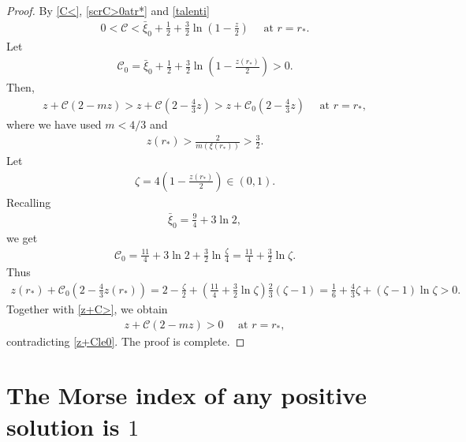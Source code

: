 \documentclass{article}
\theoremstyle{definition} \theoremstyle{remark}
\numberwithin{equation}{section}
\begin{document}
\begin{proof}
		By \eqref{C<}, \eqref{scrC>0atr*} and \eqref{talenti}
		\begin{align*}
			0 < \mathscr{C} < \bar\xi_0 + \frac{1}{2} + \frac{3}{2}\ln\left(1 - \frac{z}{2}\right) \quad \text{ at }r = r_*.
		\end{align*}
		Let
		\begin{align*}
			\mathscr{C}_0 = \bar\xi_0 + \frac{1}{2} + \frac{3}{2}\ln\left(1 - \frac{z(r_*)}{2}\right) > 0.
		\end{align*}
		Then,
		\begin{align} \label{z+C>}
			z + \mathscr{C}(2-mz) > z + \mathscr{C}\left(2-\frac{4}{3}z\right) > z + \mathscr{C}_0\left(2-\frac{4}{3}z\right) \quad \text{ at }r = r_*,
		\end{align}
		where we have used $m < 4/3$ and
		\begin{align*}
			z(r_*) > \frac{2}{m(\xi(r_*))} > \frac{3}{2}.
		\end{align*}
		Let
		\begin{align*}
			\zeta = 4\left(1 - \frac{z(r_*)}{2}\right) \in (0,1).
		\end{align*}
		Recalling
		\begin{align*}
			\bar\xi_0 = \frac{9}{4} + 3\ln 2,
		\end{align*}
		we get
		\begin{align*}
			\mathscr{C}_0 = \frac{11}{4} + 3\ln 2 + \frac{3}{2}\ln \frac{\zeta}{4} = \frac{11}{4} + \frac{3}{2}\ln \zeta.
		\end{align*}
		Thus
		\begin{align*}
			z(r_*) + \mathscr{C}_0\left(2-\frac{4}{3}z(r_*)\right) = 2 - \frac{\zeta}{2} + \left(\frac{11}{4} + \frac{3}{2}\ln \zeta\right)\frac{2}{3}(\zeta - 1) = \frac{1}{6} + \frac{4}{3}\zeta + (\zeta - 1)\ln \zeta > 0.
		\end{align*}
		Together with \eqref{z+C>}, we obtain
		\begin{align*}
			z + \mathscr{C}(2-mz) > 0 \quad \text{ at } r = r_*,
		\end{align*}	
		contradicting \eqref{z+Cle0}. The proof is complete.
	\end{proof}

\vskip0.36in



	\section{The Morse index of any positive solution is $1$} \label{secMorse}
\end{document}
